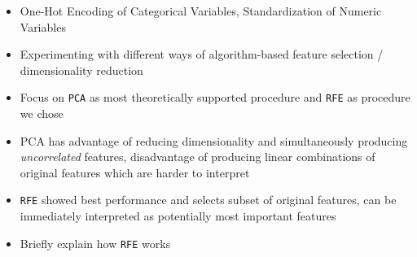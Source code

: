 \documentclass[12pt, letterpaper]{article}
\begin{document}

\begin{itemize}
    \item One-Hot Encoding of Categorical Variables, Standardization of Numeric Variables
    \item Experimenting with different ways of algorithm-based feature selection / dimensionality reduction
    \item Focus on \texttt{PCA} as most theoretically supported procedure and \texttt{RFE} as procedure we chose
    \item PCA has advantage of reducing dimensionality and simultaneously producing \emph{uncorrelated} features, disadvantage of producing linear combinations of original features which are harder to interpret
    \item \texttt{RFE} showed best performance and selects subset of original features, can be immediately interpreted as potentially most important features
    \item Briefly explain how \texttt{RFE} works
\end{itemize}


\newpage



\end{document}

